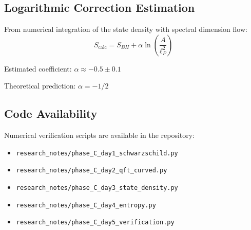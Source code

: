 \subsection{Logarithmic Correction Estimation}

From numerical integration of the state density with spectral dimension flow:
\begin{equation}
    S_{\text{calc}} = S_{BH} + \alpha \ln\left(\frac{A}{\ell_P^2}\right)
\end{equation}

Estimated coefficient: $\alpha \approx -0.5 \pm 0.1$

Theoretical prediction: $\alpha = -1/2$

\subsection{Code Availability}

Numerical verification scripts are available in the repository:
\begin{itemize}
    \item \texttt{research\_notes/phase\_C\_day1\_schwarzschild.py}
    \item \texttt{research\_notes/phase\_C\_day2\_qft\_curved.py}
    \item \texttt{research\_notes/phase\_C\_day3\_state\_density.py}
    \item \texttt{research\_notes/phase\_C\_day4\_entropy.py}
    \item \texttt{research\_notes/phase\_C\_day5\_verification.py}
\end{itemize}
